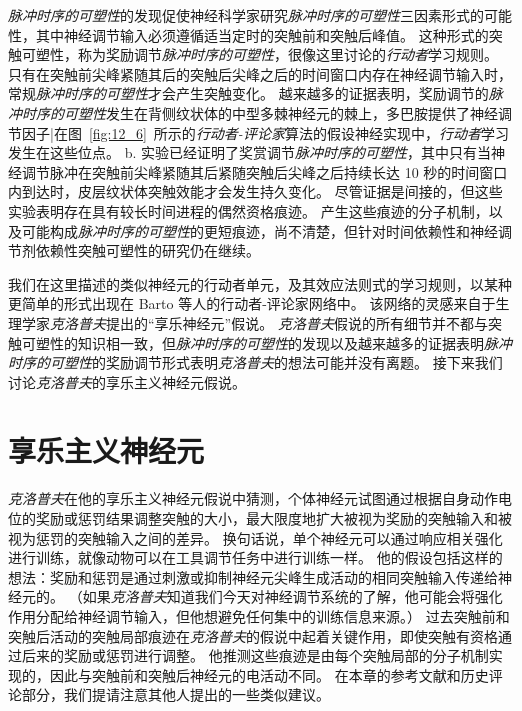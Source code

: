 \textit{脉冲时序的可塑性}的发现促使神经科学家研究\textit{脉冲时序的可塑性}三因素形式的可能性，其中神经调节输入必须遵循适当定时的突触前和突触后峰值。
这种形式的突触可塑性，称为奖励调节\textit{脉冲时序的可塑性}，很像这里讨论的\textit{行动者}学习规则。
只有在突触前尖峰紧随其后的突触后尖峰之后的时间窗口内存在神经调节输入时，常规\textit{脉冲时序的可塑性}才会产生突触变化。
越来越多的证据表明，奖励调节的\textit{脉冲时序的可塑性}发生在背侧纹状体的中型多棘神经元的棘上，多巴胺提供了神经调节因子|在图~\ref{fig:12_6}~所示的\textit{行动者-评论家}算法的假设神经实现中，\textit{行动者}学习发生在这些位点。
b. 实验已经证明了奖赏调节\textit{脉冲时序的可塑性}，其中只有当神经调节脉冲在突触前尖峰紧随其后紧随突触后尖峰之后持续长达 10 秒的时间窗口内到达时，皮层纹状体突触效能才会发生持久变化\cite{yagishita2014critical}。
尽管证据是间接的，但这些实验表明存在具有较长时间进程的偶然资格痕迹。
产生这些痕迹的分子机制，以及可能构成\textit{脉冲时序的可塑性}的更短痕迹，尚不清楚，但针对时间依赖性和神经调节剂依赖性突触可塑性的研究仍在继续。


我们在这里描述的类似神经元的行动者单元，及其效应法则式的学习规则，以某种更简单的形式出现在 Barto 等人的行动者-评论家网络中\cite{barto13neuron}。
该网络的灵感来自于生理学家\textit{克洛普夫}提出的“享乐神经元”假说\cite{klopf1972brain,klopf1982hedonistic}。
\textit{克洛普夫}假说的所有细节并不都与突触可塑性的知识相一致，但\textit{脉冲时序的可塑性}的发现以及越来越多的证据表明\textit{脉冲时序的可塑性}的奖励调节形式表明\textit{克洛普夫}的想法可能并没有离题。
接下来我们讨论\textit{克洛普夫}的享乐主义神经元假说。



\section{享乐主义神经元}


\textit{克洛普夫}\cite{klopf1972brain,klopf1982hedonistic}在他的享乐主义神经元假说中猜测，个体神经元试图通过根据自身动作电位的奖励或惩罚结果调整突触的大小，最大限度地扩大被视为奖励的突触输入和被视为惩罚的突触输入之间的差异。
换句话说，单个神经元可以通过响应相关强化进行训练，就像动物可以在工具调节任务中进行训练一样。
他的假设包括这样的想法：奖励和惩罚是通过刺激或抑制神经元尖峰生成活动的相同突触输入传递给神经元的。
（如果\textit{克洛普夫}知道我们今天对神经调节系统的了解，他可能会将强化作用分配给神经调节输入，但他想避免任何集中的训练信息来源。）
过去突触前和突触后活动的突触局部痕迹在\textit{克洛普夫}的假说中起着关键作用，即使突触有资格通过后来的奖励或惩罚进行调整。
他推测这些痕迹是由每个突触局部的分子机制实现的，因此与突触前和突触后神经元的电活动不同。
在本章的参考文献和历史评论部分，我们提请注意其他人提出的一些类似建议。


